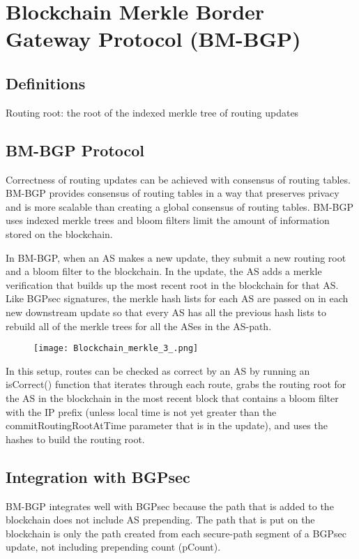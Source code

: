 \documentclass[letterpaper, 10 pt, conference]{ieeeconf}  %
\begin{document}
\section{Blockchain Merkle Border Gateway Protocol (BM-BGP)}

\subsection{Definitions}
Routing root: the root of the indexed merkle tree of routing updates

\subsection{BM-BGP Protocol}

Correctness of routing updates can be achieved with consensus of routing tables. BM-BGP provides consensus of routing tables in a way that preserves privacy and is more scalable than creating a global consensus of routing tables. BM-BGP uses indexed merkle trees and bloom filters limit the amount of information stored on the blockchain. 

In BM-BGP, when an AS makes a new update, they submit a new routing root and a bloom filter to the blockchain. In the update, the AS adds a merkle verification that builds up the most recent root in the blockchain for that AS. Like BGPsec signatures, the merkle hash lists for each AS are passed on in each new downstream update so that every AS has all the previous hash lists to rebuild all of the merkle trees for all the ASes in the AS-path.

\begin{figure}[!ht]
	\centering
	\texttt{[image: Blockchain\_merkle\_3\_.png]}
    \end{figure}
 
In this setup, routes can be checked as correct by an AS by running an isCorrect() function that iterates through each route, grabs the routing root for the AS in the blockchain in the most recent block that contains a bloom filter with the IP prefix (unless local time is not yet greater than the commitRoutingRootAtTime parameter that is in the update), and uses the hashes to build the routing root. 

\subsection{Integration with BGPsec}
BM-BGP integrates well with BGPsec because the path that is added to the blockchain does not include AS prepending. The path that is put on the blockchain is only the path created from each secure-path segment of a BGPsec update, not including prepending count (pCount). 
\end{document}
